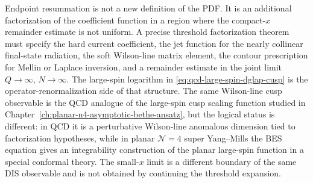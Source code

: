 Endpoint resummation is not a new definition of the PDF.  It is an additional
factorization of the coefficient function in a region where the compact-\(x\)
remainder estimate is not uniform.  A precise threshold factorization theorem
must specify the hard current coefficient, the jet function for the nearly
collinear final-state radiation, the soft Wilson-line matrix element, the
contour prescription for Mellin or Laplace inversion, and a remainder estimate
in the joint limit \(Q\to\infty\), \(N\to\infty\).  The large-spin logarithm in
\eqref{eq:qcd-large-spin-dglap-cusp} is the operator-renormalization side of
that structure.  The same Wilson-line cusp observable is the QCD analogue of
the large-spin cusp scaling function studied in
Chapter~\ref{ch:planar-n4-asymptotic-bethe-ansatz}, but the logical status is
different: in QCD it is a perturbative Wilson-line anomalous dimension tied
to factorization hypotheses, while in planar \(\mathcal N=4\) super
Yang--Mills the BES equation gives an integrability construction of the
planar large-spin function in a special conformal theory.  The small-\(x\)
limit is a different boundary of the same DIS observable and is not obtained
by continuing the threshold expansion.

